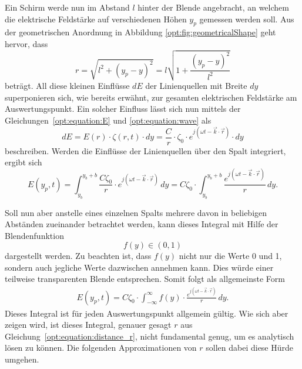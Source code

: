 Ein Schirm werde nun im Abstand $l$ hinter der Blende angebracht, an welchem die elektrische Feldstärke auf verschiedenen Höhen $y_p$ gemessen werden soll.
Aus der geometrischen Anordnung in Abbildung \ref{opt:fig:geometricalShape} geht hervor, dass
\begin{equation}
r
=
\sqrt{l^2 + (y_p-y)^2}
=
l \sqrt{1 + \frac{(y_p-y)^2}{l^2}}
\label{opt:equation:distance_r}
\end{equation}
beträgt. All diese kleinen Einflüsse $dE$ der Linienquellen mit Breite $dy$ superponieren sich, wie bereits erwähnt, zur gesamten elektrischen Feldstärke am Auswertungspunkt.
Ein solcher Einfluss lässt sich nun mittels der Gleichungen~\ref{opt:equation:E} und \ref{opt:equation:wave} als
\begin{equation}
dE
=
E(r) \cdot \zeta(r, t) \cdot dy
=
\frac{C}{r} \cdot \zeta_0 \cdot e^{j(\omega t - \vec{k}\cdot\vec{r})} \cdot dy
\end{equation}
beschreiben.
Werden die Einflüsse der Linienquellen über den Spalt integriert, ergibt sich
\begin{equation}
E(y_p, t)
=
\int_{y_b}^{y_b+b}\frac{C\zeta_0}{r} \cdot e^{j(\omega t - \vec{k}\cdot\vec{r})} \,dy
=
C\zeta_0 \cdot \int_{y_b}^{y_b+b}\frac{e^{j(\omega t - \vec{k}\cdot\vec{r})}}{r} \,dy
.
\end{equation}

Soll nun aber anstelle eines einzelnen Spalts mehrere davon in beliebigen Abständen zueinander betrachtet werden, kann dieses Integral mit Hilfe der Blendenfunktion
\begin{equation}
f(y)
\in
(0, 1)
\end{equation}
dargestellt werden.
Zu beachten ist, dass $f(y)$ nicht nur die Werte 0 und 1, sondern auch jegliche Werte dazwischen annehmen kann.
Dies würde einer teilweise transparenten Blende entsprechen.
Somit folgt als allgemeinste Form
\begin{align}
E(y_p, t)
=
C\zeta_0 \cdot \int_{-\infty}^{\infty}f(y)\cdot\frac{e^{j(\omega t - \vec{k}\cdot\vec{r})}}{r} \,dy
.
\label{opt:equation:integral_general}
\end{align}
Dieses Integral ist für jeden Auswertungspunkt allgemein gültig.
Wie sich aber zeigen wird, ist dieses Integral, genauer gesagt $r$ aus Gleichung~\ref{opt:equation:distance_r}, nicht fundamental genug, um es analytisch lösen zu können.
Die folgenden Approximationen von $r$ sollen dabei diese Hürde umgehen.

